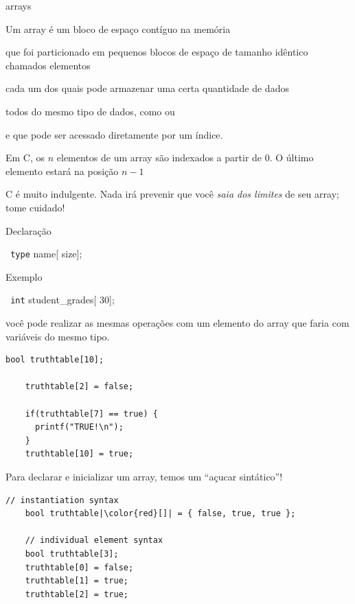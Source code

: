 \documentclass{beamer}
\begin{document}
\begin{frame}{arrays}

  Um array é um bloco de espaço contíguo na memória
  
  que foi particionado em pequenos blocos de espaço de tamanho
  idêntico chamados elementos
  
  cada um dos quais pode armazenar uma certa quantidade de dados
  
  todos do mesmo tipo de dados, como  ou 

  e que pode ser acessado diretamente por um índice.

  \framebreak

  Em C, os $n$ elementos de um array são indexados a partir de 0. O
  último elemento estará na posição $n-1$

  C é muito indulgente. Nada irá prevenir que você \emph{saia dos
    limites} de seu array; tome cuidado!

  \framebreak

  Declaração

  {\texttt {\color{green} type} {\color{red} name}[{\color{blue} size}];}

  Exemplo

  {\texttt {\color{green} int} {\color{red} student\_grades}[{\color{blue} 30}];}

  \framebreak

  você pode realizar as mesmas operações com um elemento do array que
  faria com variáveis do mesmo tipo.\vspace{.5cm}

  \begin{lstlisting}[style=normalc]
    bool truthtable[10];
    
    truthtable[2] = false;
    
    if(truthtable[7] == true) {
      printf("TRUE!\n");
    }
    truthtable[10] = true;
  \end{lstlisting}

  \framebreak

  Para declarar e inicializar um array, temos um ``açucar sintático''!\vspace{.5cm}

  \begin{lstlisting}[style=ssc,escapechar={|}]
    // instantiation syntax
    bool truthtable|\color{red}[]| = { false, true, true };

    // individual element syntax
    bool truthtable[3];
    truthtable[0] = false;
    truthtable[1] = true;
    truthtable[2] = true;
  \end{lstlisting}


\end{frame}
\end{document}
